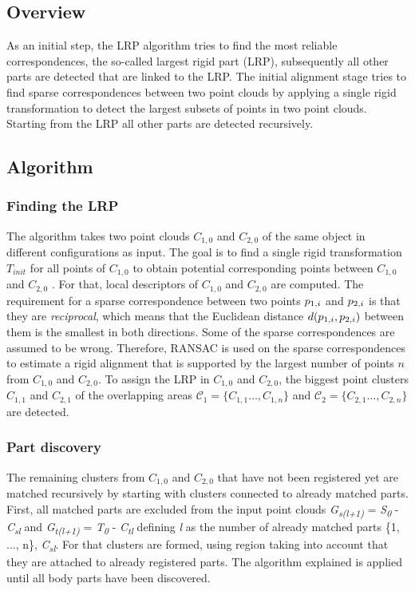 \documentclass[notitlepage,english]{hgbreport}
\begin{document}
	\subsection{Overview}
	As an initial step, the LRP algorithm tries to find the most reliable correspondences, the so-called largest rigid part (LRP), subsequently all other parts are detected that are linked to the LRP. The initial alignment stage tries to find sparse correspondences between two point clouds by applying a single rigid transformation to detect the largest subsets of points in two point clouds. Starting from the LRP all other parts are detected recursively.
	\subsection{Algorithm} 
	
	\subsubsection{Finding the LRP}
	
	The algorithm takes two point clouds $C_{1,0}$ and $C_{2,0}$ of the same object in different configurations as input.
	The goal is to find a single rigid transformation $T_{init}$ for all points of $C_{1,0}$ to obtain potential corresponding points between $C_{1,0}$ and $C_{2,0}$ . For that, local descriptors of $C_{1,0}$ and $C_{2,0}$ are computed. The requirement for a sparse correspondence between two points $\boldmath{p}_{1,i}$ and $\boldmath{p}_{2,i}$  is that they are \textit{reciprocal}, which means that the Euclidean distance $d(\boldmath{p}_{1,i}, \boldmath{p}_{2,i})$ between them is the smallest in both directions. Some of the sparse correspondences are assumed to be wrong. Therefore, RANSAC is used on the sparse correspondences  to estimate a rigid alignment that is supported by the largest number of points $n$ from $C_{1,0}$ and $C_{2,0}$. To assign the LRP in $C_{1,0}$ and $C_{2,0}$, the biggest point clusters $C_{1,1}$ and $C_{2,1}$ of the overlapping areas $\mathcal{C_1} = \{C_{1,1}\ldots,C_{1,n}\}$ and  $\mathcal{C_2} = \{C_{2,1}\ldots,C_{2,n}\}$ are detected. 
	
	
	\subsubsection{Part discovery}
	
	The remaining clusters from $C_{1,0}$ and $C_{2,0}$ that have not been registered yet are matched recursively by starting with clusters connected to already matched parts. First, all matched parts are excluded from the input point clouds  \textit{G\textsubscript{s(l+1)}} = \textit{S\textsubscript{0}} - \textit{C\textsubscript{sl}} and \textit{G\textsubscript{t(l+1)}} = \textit{T\textsubscript{0}} - \textit{C\textsubscript{tl}} defining \textit{l} as the number of already matched parts \{1, ..., n\}, \textit{C\textsubscript{sl}}. For that clusters are formed, using region taking into account that they are attached to already registered parts. The algorithm explained is applied until all body parts have been discovered.
	
\end{document}
